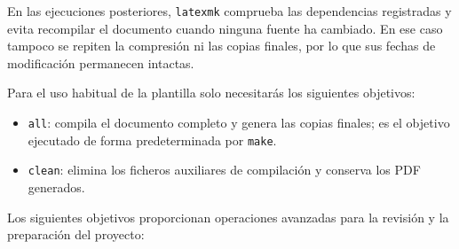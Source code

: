 En las ejecuciones posteriores, \texttt{latexmk} comprueba las dependencias registradas y evita recompilar el documento cuando ninguna fuente ha cambiado. En ese caso tampoco se repiten la compresión ni las copias finales, por lo que sus fechas de modificación permanecen intactas.

Para el uso habitual de la plantilla solo necesitarás los siguientes objetivos:

\begin{itemize}
  \item \texttt{all}: compila el documento completo y genera las copias finales; es el objetivo ejecutado de forma predeterminada por \texttt{make}.
  \item \texttt{clean}: elimina los ficheros auxiliares de compilación y conserva los PDF generados.
\end{itemize}

Los siguientes objetivos proporcionan operaciones avanzadas para la revisión y la preparación del proyecto:

